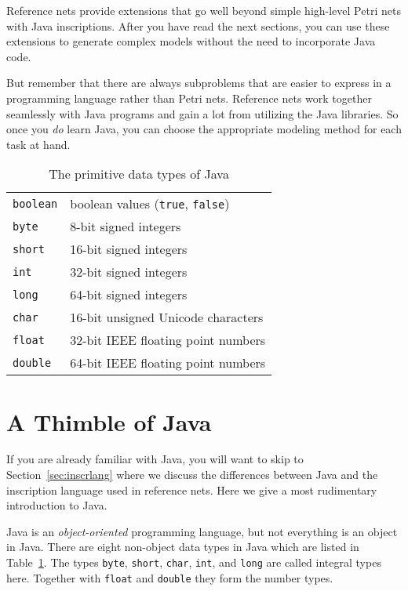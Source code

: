 Reference nets provide extensions that go well beyond
simple high-level Petri nets with Java inscriptions.
After you have read the next sections, you can use these
extensions to generate complex models without the need to
incorporate Java code.

But remember that there are always subproblems that are
easier to express in a programming language rather than
Petri nets. Reference nets work together seamlessly with Java programs
and gain a lot from utilizing the Java libraries.
So once you \emph{do} learn Java, you can choose the
appropriate modeling method for each task at hand.


\begin{table}
  \begin{center}
    \begin{tabular}{ll}
      \texttt{boolean} & boolean values (\texttt{true}, \texttt{false})\\
      \texttt{byte} & 8-bit signed integers \\
      \texttt{short} & 16-bit signed integers \\
      \texttt{int} & 32-bit signed integers \\
      \texttt{long} & 64-bit signed integers \\
      \texttt{char} & 16-bit unsigned Unicode characters \\
      \texttt{float} & 32-bit IEEE floating point numbers \\
      \texttt{double} & 64-bit IEEE floating point numbers \\
    \end{tabular}
  \end{center}
  \caption{The primitive data types of Java}
  \label{tab:primtypes}
\end{table}


\section{A Thimble of Java}

If you are already familiar with Java, you will want to skip
to Section~\ref{sec:inscrlang} where we discuss the differences
between Java and the inscription language used in reference nets.
Here we give a most rudimentary introduction to Java.

Java is an \emph{object-oriented} programming language, but
not everything is an object in Java. There are eight
non-object data types in Java which are listed in
Table~\ref{tab:primtypes}. The types \texttt{byte},
\texttt{short}, \texttt{char}, \texttt{int}, and \texttt{long}
are called integral types here. Together with \texttt{float}
and \texttt{double} they form the number types.

